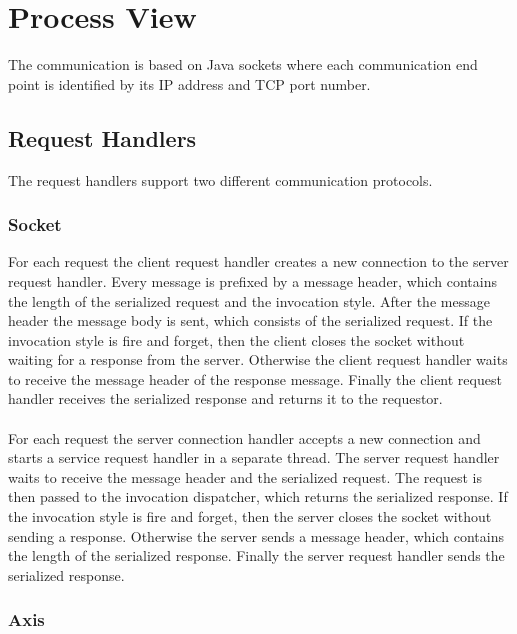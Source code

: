 \section{Process View}

The communication is based on Java sockets where each communication end point is identified by its IP address and TCP port number.

\subsection{Request Handlers}

The request handlers support two different communication protocols.

\subsubsection{Socket}

For each request the client request handler creates a new connection to the server request handler.
Every message is prefixed by a message header, which contains the length of the serialized request and the invocation style.
After the message header the message body is sent, which consists of the serialized request.
If the invocation style is fire and forget, then the client closes the socket without waiting for a response from the server.
Otherwise the client request handler waits to receive the message header of the response message.
Finally the client request handler receives the serialized response and returns it to the requestor.\\
\\
For each request the server connection handler accepts a new connection and starts a service request handler in a separate thread.
The server request handler waits to receive the message header and the serialized request.
The request is then passed to the invocation dispatcher, which returns the serialized response.
If the invocation style is fire and forget, then the server closes the socket without sending a response.
Otherwise the server sends a message header, which contains the length of the serialized response.
Finally the server request handler sends the serialized response.

\subsubsection{Axis}

